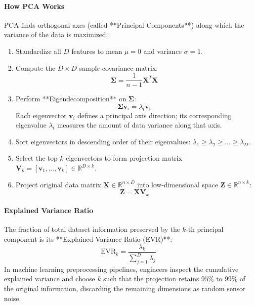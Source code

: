 \paragraph{How PCA Works}
PCA finds orthogonal axes (called **Principal Components**) along which the variance of the data is maximized:
\begin{enumerate}
    \item Standardize all $D$ features to mean $\mu = 0$ and variance $\sigma = 1$.
    \item Compute the $D \times D$ sample covariance matrix:
    \begin{equation}
    \mathbf{\Sigma} = \frac{1}{n - 1} \mathbf{X}^T \mathbf{X}\label{eq:pca_covariance}
    \end{equation}
    \item Perform **Eigendecomposition** on $\mathbf{\Sigma}$:
    \begin{equation}
    \mathbf{\Sigma} \mathbf{v}_i = \lambda_i \mathbf{v}_i\label{eq:pca_eigendecomposition}
    \end{equation}
    Each eigenvector $\mathbf{v}_i$ defines a principal axis direction; its corresponding eigenvalue $\lambda_i$ measures the amount of data variance along that axis.
    \item Sort eigenvectors in descending order of their eigenvalues: $\lambda_1 \ge \lambda_2 \ge \dots \ge \lambda_D$.
    \item Select the top $k$ eigenvectors to form projection matrix $\mathbf{V}_k = [\mathbf{v}_1, \dots, \mathbf{v}_k] \in \mathbb{R}^{D \times k}$.
    \item Project original data matrix $\mathbf{X} \in \mathbb{R}^{n \times D}$ into low-dimensional space $\mathbf{Z} \in \mathbb{R}^{n \times k}$:
    \begin{equation}
    \mathbf{Z} = \mathbf{X} \mathbf{V}_k\label{eq:pca_projection}
    \end{equation}
\end{enumerate}

\paragraph{Explained Variance Ratio}
The fraction of total dataset information preserved by the $k$-th principal component is its **Explained Variance Ratio (EVR)**:
\begin{equation}
\text{EVR}_k = \frac{\lambda_k}{\sum_{j=1}^{D} \lambda_j}\label{eq:pca_evr}
\end{equation}
In machine learning preprocessing pipelines, engineers inspect the cumulative explained variance and choose $k$ such that the projection retains $95\%$ to $99\%$ of the original information, discarding the remaining dimensions as random sensor noise.


